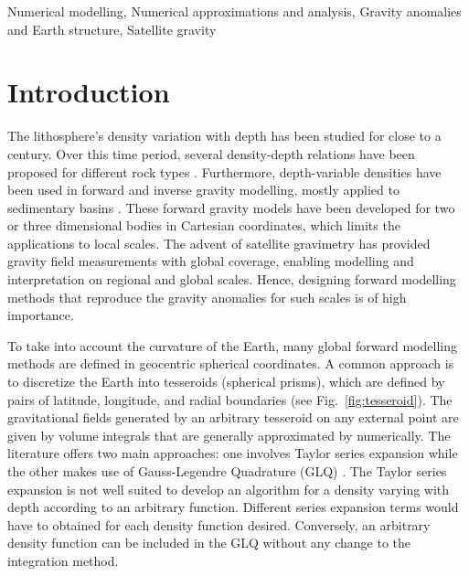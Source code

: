 \documentclass[extra]{gji}
\begin{document}
\begin{keywords}
Numerical modelling, Numerical approximations and analysis, Gravity anomalies
and Earth structure, Satellite gravity
\end{keywords}


\section{Introduction}

The lithosphere's density variation with depth has been studied for close to a
century.
Over this time period,
several density-depth relations have been proposed for different rock types
\citep[e.g.,][]{Maxant1980, Rao1986, Rao1993, Rao1994}.
Furthermore, depth-variable densities have been used in forward and
inverse gravity modelling, mostly applied to sedimentary basins
\citep{Cordell1973, Rao1986, Cowie1990, Rao1993, Rao1994, Zhang2001,
Welford2010}.
These forward gravity models have been developed for two or three dimensional
bodies in Cartesian coordinates, which limits the applications to local scales.
The advent of satellite gravimetry has provided gravity field
measurements with global coverage, enabling modelling and interpretation on regional and
global scales.
Hence, designing forward modelling methods that reproduce the gravity anomalies for
such scales is of high importance.

To take into account the curvature of the Earth, many global forward modelling methods
are defined in geocentric spherical coordinates.
A common approach is to discretize the Earth into tesseroids (spherical prisms),
which are defined by pairs of latitude, longitude, and
radial boundaries (see Fig.~\ref{fig:tesseroid}).
The gravitational fields generated by an arbitrary
tesseroid on any external point are given by volume
integrals that are generally approximated by numerically.
The literature offers two main approaches: one involves Taylor series expansion
\citep{Heck2007, Grombein2013} while the other makes use of Gauss-Legendre
Quadrature (GLQ)
\citep{Asgharzadeh2007, Wild-Pfeiffer2008, Li2011, Uieda2016}.
The Taylor series expansion is not well suited to develop an algorithm for
a density varying with depth according to an arbitrary function.
Different series expansion terms would have to obtained for each density function
desired.
Conversely, an arbitrary density function can be included in the GLQ without
any change to the integration method.
\end{document}
